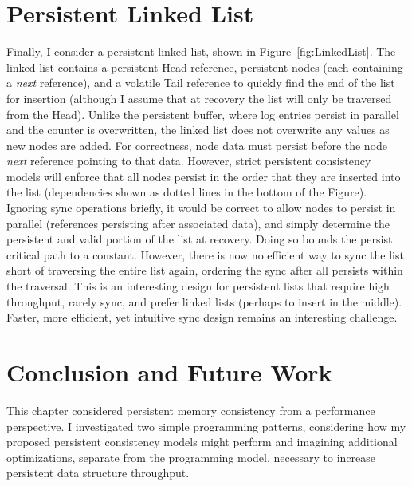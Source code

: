 \section{Persistent Linked List}
\label{sec:PMC_patterns:LinkedList}



Finally, I consider a persistent linked list, shown in Figure~\ref{fig:LinkedList}.
The linked list contains a persistent Head reference, persistent nodes (each containing a \emph{next} reference), and a volatile Tail reference to quickly find the end of the list for insertion (although I assume that at recovery the list will only be traversed from the Head).
Unlike the persistent buffer, where log entries persist in parallel and the counter is overwritten, the linked list does not overwrite any values as new nodes are added.
For correctness, node data must persist before the node \emph{next} reference pointing to that data.
However, strict persistent consistency models will enforce that all nodes persist in the order that they are inserted into the list (dependencies shown as dotted lines in the bottom of the Figure).
Ignoring sync operations briefly, it would be correct to allow nodes to persist in parallel (references persisting after associated data), and simply determine the persistent and valid portion of the list at recovery.
Doing so bounds the persist critical path to a constant.
However, there is now no efficient way to sync the list short of traversing the entire list again, ordering the sync after all persists within the traversal.
This is an interesting design for persistent lists that require high throughput, rarely sync, and prefer linked lists (perhaps to insert in the middle).
Faster, more efficient, yet intuitive sync design remains an interesting challenge.

\section{Conclusion and Future Work}
\label{sec:PMC_patterns:Conclusion}

This chapter considered persistent memory consistency from a performance perspective.
I investigated two simple programming patterns, considering how my proposed persistent consistency models might perform and imagining additional optimizations, separate from the programming model, necessary to increase persistent data structure throughput.

